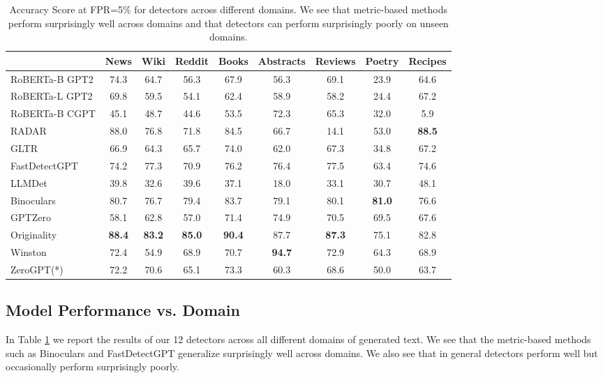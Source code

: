 \documentclass[11pt]{article}
\begin{document}
\begin{table}[t]
    \small
    \centering
    \begin{tabular}{l|c|c|c|c|c|c|c|c}
    \toprule 
    &\textbf{News}&\textbf{Wiki}&\textbf{Reddit}&\textbf{Books}&\textbf{Abstracts}&\textbf{Reviews}&\textbf{Poetry}&\textbf{Recipes}\\
    \midrule
    RoBERTa-B GPT2&74.3&64.7&56.3&67.9&56.3&69.1&23.9&64.6\\
    RoBERTa-L GPT2&69.8&59.5&54.1&62.4&58.9&58.2&24.4&67.2\\
    RoBERTa-B CGPT&45.1&48.7&44.6&53.5&72.3&65.3&32.0&5.9\\
    RADAR&88.0&76.8&71.8&84.5&66.7&14.1&53.0&\textbf{88.5}\\
    \midrule
    GLTR&66.9&64.3&65.7&74.0&62.0&67.3&34.8&67.2\\
    FastDetectGPT&74.2&77.3&70.9&76.2&76.4&77.5&63.4&74.6\\
    LLMDet&39.8&32.6&39.6&37.1&18.0&33.1&30.7&48.1\\
    Binoculars&80.7&76.7&79.4&83.7&79.1&80.1&\textbf{81.0}&76.6\\
    \midrule
    GPTZero&58.1&62.8&57.0&71.4&74.9&70.5&69.5&67.6\\
    Originality&\textbf{88.4}&\textbf{83.2}&\textbf{85.0}&\textbf{90.4}&87.7&\textbf{87.3}&75.1&82.8\\
    Winston&72.4&54.9&68.9&70.7&\textbf{94.7}&72.9&64.3&68.9\\
    ZeroGPT(*)&72.2&70.6&65.1&73.3&60.3&68.6&50.0&63.7\\
    \bottomrule
    \end{tabular}
    \caption{Accuracy Score at FPR=5\% for detectors across different domains. We see that metric-based methods perform surprisingly well across domains and that detectors can perform surprisingly poorly on unseen domains.}
    \label{tab:per_domain_results}
\end{table}

\subsection{Model Performance vs. Domain}
In Table \ref{tab:per_domain_results} we report the results of our 12 detectors across all different domains of generated text. We see that the metric-based methods such as Binoculars and FastDetectGPT generalize surprisingly well across domains. We also see that in general detectors perform well but occasionally perform surprisingly poorly.
\end{document}
